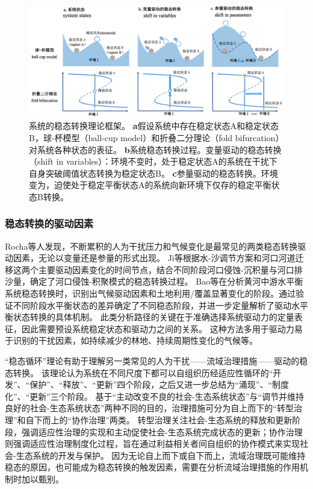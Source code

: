 \begin{figure}[htb] %
    \centering
    \includegraphics[width=\textwidth]{img/ch1/ch1_regime_shift.png}
    \caption[系统的稳态转换理论框架]{系统的稳态转换理论框架。
    \textbf{a}假设系统中存在稳定状态A和稳定状态B，球-杯模型（ball-cup model）和折叠二分理论（fold bifurcation）对系统各种状态的表征。
    \textbf{b}系统稳态转换过程。变量驱动的稳态转换（shift in variables）：环境\uppercase{}不变时，处于稳定状态A的系统在干扰下自身突破阈值状态转换为稳定状态B。
    \textbf{c}参量驱动的稳态转换。环境\uppercase{}变为\uppercase{}，迫使处于稳定平衡状态A的系统向新环境下仅存的稳定平衡状态B转换。}\label{ch1:fig:regime_shift}
\end{figure}

\subsubsection{稳态转换的驱动因素}

Rocha等人发现，不断累积的人为干扰压力和气候变化是最常见的两类稳态转换驱动因素，无论以变量还是参量的形式出现\cite{rocha2018}。
Ji等根据水-沙调节方案和河口河道迁移这两个主要驱动因素变化的时间节点，结合不同阶段河口侵蚀-沉积量与河口排沙量，确定了河口侵蚀-积聚模式的稳态转换过程\cite{ji2018}。
Bao等在分析黄河中游水平衡系统稳态转换时，识别出气候驱动因素和土地利用/覆盖显著变化的阶段。通过验证不同阶段水平衡状态的差异确定了不同稳态阶段，并进一步定量解析了驱动水平衡状态转换的具体机制\cite{bao2019}。
此类分析路径的关键在于准确选择系统驱动力的定量表征，因此需要预设系统稳定状态和驱动力之间的关系。
这种方法多用于驱动力易于识别的干扰因素，如持续减少的林地、持续周期性变化的气候等。

“稳态循环”理论有助于理解另一类常见的人为干扰——流域治理措施——驱动的稳态转换。
该理论认为系统在不同尺度下都可以自组织历经适应性循环的“开发”、“保护”、“释放”、“更新”四个阶段\cite{gunderson2001}，之后又进一步总结为“涌现”、“制度化”、“更新”三个阶段。
基于“主动改变不良的社会-生态系统状态”与“调节并维持良好的社会-生态系统状态”两种不同的目的，治理措施可分为自上而下的“转型治理”和自下而上的“协作治理”两类\cite{song2019}。
转型治理关注社会-生态系统的释放和更新阶段，强调适应性治理的实现和主动促使社会-生态系统完成状态的更新；协作治理则强调适应性治理制度化过程，旨在通过利益相关者间自组织的协作模式来实现社会-生态系统的开发与保护\cite{song2019}。
因为无论自上而下或自下而上，流域治理既可能维持稳态的原因，也可能成为稳态转换的触发因素，需要在分析流域治理措施的作用机制时加以甄别。

